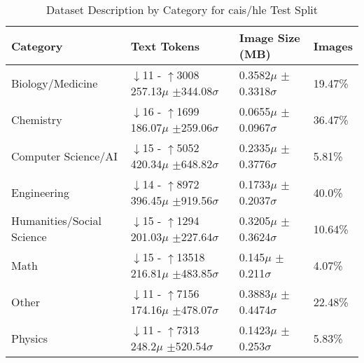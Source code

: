 \begin{table}[H]
\centering
\begin{tabular}{llll}
\toprule
Category & Text Tokens  & Image Size (MB) & Images \\
\midrule
Biology/Medicine & $\downarrow$11 - $\uparrow$3008 257.13$\mu$ $\pm$344.08$\sigma$ & 0.3582$\mu$ $\pm$0.3318$\sigma$ & 19.47\% \\
Chemistry & $\downarrow$16 - $\uparrow$1699 186.07$\mu$ $\pm$259.06$\sigma$ & 0.0655$\mu$ $\pm$0.0967$\sigma$ & 36.47\% \\
Computer Science/AI & $\downarrow$15 - $\uparrow$5052 420.34$\mu$ $\pm$648.82$\sigma$ & 0.2335$\mu$ $\pm$0.3776$\sigma$ & 5.81\% \\
Engineering & $\downarrow$14 - $\uparrow$8972 396.45$\mu$ $\pm$919.56$\sigma$ & 0.1733$\mu$ $\pm$0.2037$\sigma$ & 40.0\% \\
Humanities/Social Science & $\downarrow$15 - $\uparrow$1294 201.03$\mu$ $\pm$227.64$\sigma$ & 0.3205$\mu$ $\pm$0.3624$\sigma$ & 10.64\% \\
Math & $\downarrow$15 - $\uparrow$13518 216.81$\mu$ $\pm$483.85$\sigma$ & 0.145$\mu$ $\pm$0.211$\sigma$ & 4.07\% \\
Other & $\downarrow$11 - $\uparrow$7156 174.16$\mu$ $\pm$478.07$\sigma$ & 0.3883$\mu$ $\pm$0.4474$\sigma$ & 22.48\% \\
Physics & $\downarrow$11 - $\uparrow$7313 248.2$\mu$ $\pm$520.54$\sigma$ & 0.1423$\mu$ $\pm$0.253$\sigma$ & 5.83\% \\
\bottomrule
\end{tabular}
\vspace{0.2cm}
\caption{Dataset Description by Category for cais/hle Test Split}
\label{tab:dataset_description}
\end{table}
